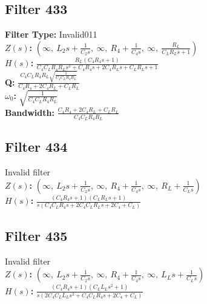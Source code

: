 \documentclass{article}
\begin{document}
\subsection*{Filter 433}
\textbf{Filter Type:} Invalid011 \\ 
\textbf{$Z(s)$:} $\left( \infty, \  L_{2} s + \frac{1}{C_{2} s}, \  \infty, \  R_{4} + \frac{1}{C_{4} s}, \  \infty, \  \frac{R_{L}}{C_{L} R_{L} s + 1}\right)$ \\ 
\textbf{$H(s)$:} $\frac{R_{L} \left(C_{4} R_{4} s + 1\right)}{C_{4} C_{L} R_{4} R_{L} s^{2} + C_{4} R_{4} s + 2 C_{4} R_{L} s + C_{L} R_{L} s + 1}$ \\ 
\textbf{Q:} $\frac{C_{4} C_{L} R_{4} R_{L} \sqrt{\frac{1}{C_{4} C_{L} R_{4} R_{L}}}}{C_{4} R_{4} + 2 C_{4} R_{L} + C_{L} R_{L}}$ \\ 
\textbf{$\omega_0$:} $\sqrt{\frac{1}{C_{4} C_{L} R_{4} R_{L}}}$ \\ 
\textbf{Bandwidth:} $\frac{C_{4} R_{4} + 2 C_{4} R_{L} + C_{L} R_{L}}{C_{4} C_{L} R_{4} R_{L}}$ \\ 
\subsection*{Filter 434}
Invalid filter \\ 
\textbf{$Z(s)$:} $\left( \infty, \  L_{2} s + \frac{1}{C_{2} s}, \  \infty, \  R_{4} + \frac{1}{C_{4} s}, \  \infty, \  R_{L} + \frac{1}{C_{L} s}\right)$ \\ 
\textbf{$H(s)$:} $\frac{\left(C_{4} R_{4} s + 1\right) \left(C_{L} R_{L} s + 1\right)}{s \left(C_{4} C_{L} R_{4} s + 2 C_{4} C_{L} R_{L} s + 2 C_{4} + C_{L}\right)}$ \\ 
\subsection*{Filter 435}
Invalid filter \\ 
\textbf{$Z(s)$:} $\left( \infty, \  L_{2} s + \frac{1}{C_{2} s}, \  \infty, \  R_{4} + \frac{1}{C_{4} s}, \  \infty, \  L_{L} s + \frac{1}{C_{L} s}\right)$ \\ 
\textbf{$H(s)$:} $\frac{\left(C_{4} R_{4} s + 1\right) \left(C_{L} L_{L} s^{2} + 1\right)}{s \left(2 C_{4} C_{L} L_{L} s^{2} + C_{4} C_{L} R_{4} s + 2 C_{4} + C_{L}\right)}$ \\ 
\end{document}
